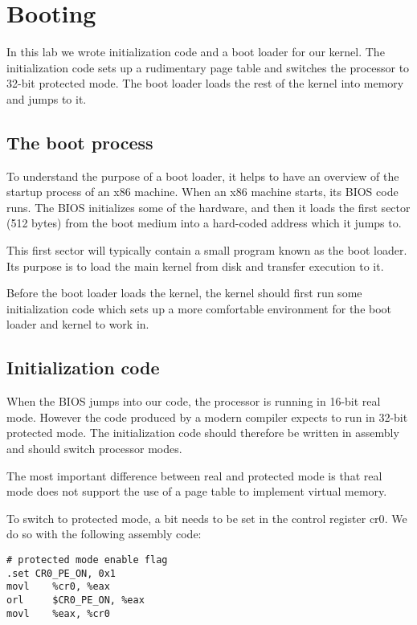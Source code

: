 \documentclass{article}
\begin{document}


\section{Booting}
\label{sec:lab1}

In this lab we wrote initialization code and a boot loader for our kernel. 
The initialization code sets up a rudimentary page table and switches the
processor to 32-bit protected mode. The boot loader loads the rest of the
kernel into memory and jumps to it.

\subsection{The boot process}
To understand the purpose of a boot loader, it helps to have an overview of
the startup process of an x86 machine.
When an x86 machine starts, its BIOS code runs. The BIOS initializes some of
the hardware, and then it loads the first sector (512 bytes) from the boot
medium into a hard-coded address which it jumps to.

This first sector will typically contain a small program known as the boot
loader. Its purpose is to load the main kernel from disk and transfer
execution to it.

Before the boot loader loads the kernel, the kernel should first run some
initialization code which sets up a more comfortable environment for the boot
loader and kernel to work in.


\subsection{Initialization code}
When the BIOS jumps into our code, the processor is running in 16-bit real
mode. However the code produced by a modern compiler expects to run in 32-bit
protected mode. The initialization code should therefore be written in
assembly and should switch processor modes.

The most important difference between real and protected mode is that real
mode does not support the use of a page table to implement virtual memory.

To switch to protected mode, a bit needs to be set in the control register
\gls{cr0}. We do so with the following assembly code:
\begin{verbatim}
# protected mode enable flag
.set CR0_PE_ON, 0x1 
movl    %cr0, %eax
orl     $CR0_PE_ON, %eax
movl    %eax, %cr0
\end{verbatim}
\end{document}
